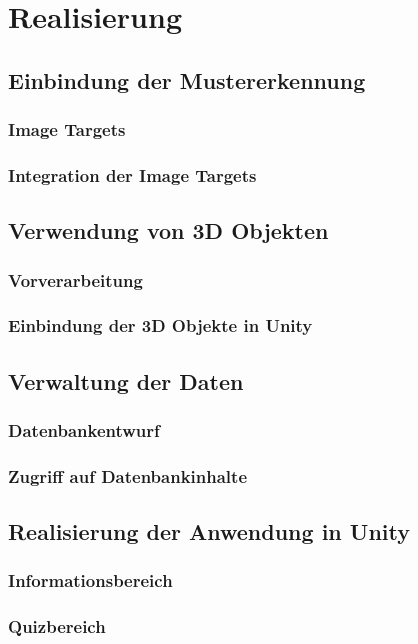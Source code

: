 \chapter{Realisierung}\label{ch:realisierung_der_anwendung}
\section{Einbindung der Mustererkennung}
\subsection{Image Targets}
\subsection{Integration der Image Targets}

\section{Verwendung von 3D Objekten}
\subsection{Vorverarbeitung}
\subsection{Einbindung der 3D Objekte in Unity}

\section{Verwaltung der Daten}
\subsection{Datenbankentwurf}
\subsection{Zugriff auf Datenbankinhalte}

\section{Realisierung der Anwendung in Unity}
\subsection{Informationsbereich}
\subsection{Quizbereich}
